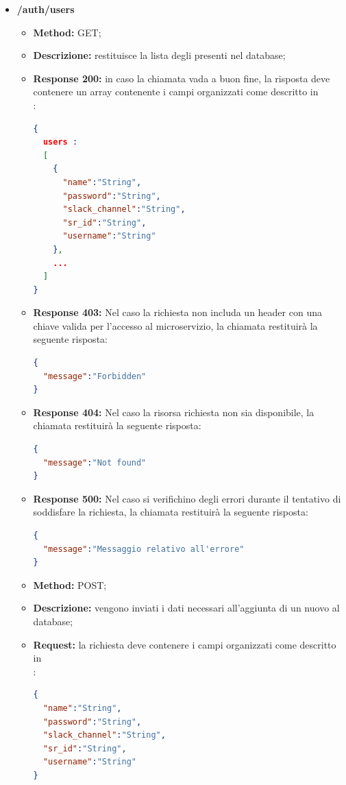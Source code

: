 \begin{itemize}
\item \textbf{/auth/users}\\
\begin{itemize}
\item \textbf{Method:} GET;
\item \textbf{Descrizione:} restituisce la lista degli  presenti nel database;
\item \textbf{Response 200:} in caso la chiamata vada a buon fine, la risposta deve contenere un array contenente i campi organizzati come descritto in \\:
\begin{lstlisting}[language=json,firstnumber=1]
{
  users :
  [
    {
      "name":"String",
      "password":"String",
      "slack_channel":"String",
      "sr_id":"String",
      "username":"String"
    },
    ...
  ]
}
\end{lstlisting}
\item \textbf{Response 403:} Nel caso la richiesta non includa un header  con una chiave valida per l'accesso al microservizio, la chiamata restituirà la seguente risposta:
\begin{lstlisting}[language=json,firstnumber=1]
{
  "message":"Forbidden"
}
\end{lstlisting}
\item \textbf{Response 404:} Nel caso la risorsa richiesta non sia disponibile, la chiamata restituirà la seguente risposta:
\begin{lstlisting}[language=json,firstnumber=1]
{
  "message":"Not found"
}
\end{lstlisting}
\item \textbf{Response 500:} Nel caso si verifichino degli errori durante il tentativo di soddisfare la richiesta, la chiamata restituirà la seguente risposta:
\begin{lstlisting}[language=json,firstnumber=1]
{
  "message":"Messaggio relativo all'errore"
}
\end{lstlisting}
\end{itemize}

\begin{itemize}
\item \textbf{Method:} POST;
\item \textbf{Descrizione:} vengono inviati i dati necessari all'aggiunta di un nuovo  al database;
\item \textbf{Request:} la richiesta deve contenere i campi organizzati come descritto in\\ :
\begin{lstlisting}[language=json,firstnumber=1]
{
  "name":"String",
  "password":"String",
  "slack_channel":"String",
  "sr_id":"String",
  "username":"String"
}
\end{lstlisting}


\end{itemize}
\end{itemize}
